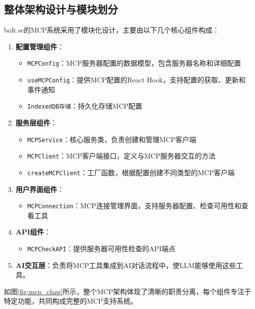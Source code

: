 \subsection{整体架构设计与模块划分}

bolt.se的MCP系统采用了模块化设计，主要由以下几个核心组件构成：

\begin{enumerate}
  \item \textbf{配置管理组件}：
    \begin{itemize}
      \item \texttt{MCPConfig}：MCP服务器配置的数据模型，包含服务器名称和详细配置
      \item \texttt{useMCPConfig}：提供MCP配置的React Hook，支持配置的获取、更新和事件通知
      \item \texttt{IndexedDB存储}：持久化存储MCP配置
    \end{itemize}
  
  \item \textbf{服务层组件}：
    \begin{itemize}
      \item \texttt{MCPService}：核心服务类，负责创建和管理MCP客户端
      \item \texttt{MCPClient}：MCP客户端接口，定义与MCP服务器交互的方法
      \item \texttt{createMCPClient}：工厂函数，根据配置创建不同类型的MCP客户端
    \end{itemize}
  
  \item \textbf{用户界面组件}：
    \begin{itemize}
      \item \texttt{MCPConnection}：MCP连接管理界面，支持服务器配置、检查可用性和查看工具
    \end{itemize}
  
  \item \textbf{API组件}：
    \begin{itemize}
      \item \texttt{MCPCheckAPI}：提供服务器可用性检查的API端点
    \end{itemize}
  
  \item \textbf{AI交互层}：负责将MCP工具集成到AI对话流程中，使LLM能够使用这些工具。
\end{enumerate}

如图\ref{fig:mcp_class}所示，整个MCP架构体现了清晰的职责分离，每个组件专注于特定功能，共同构成完整的MCP支持系统。

